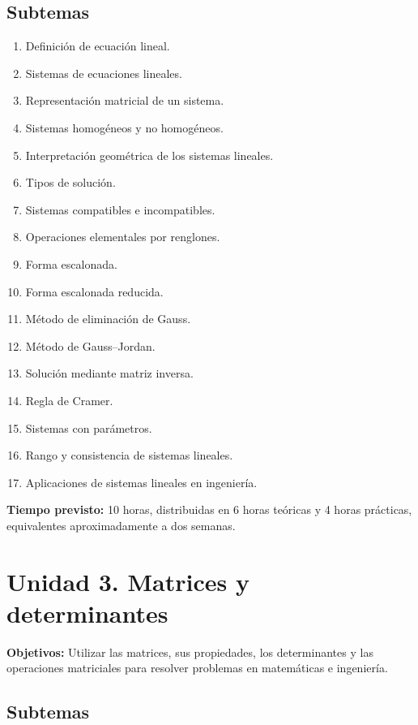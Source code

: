 \documentclass[12pt]{article}
\begin{document}
\subsection*{Subtemas}

\begin{enumerate}
    \item Definición de ecuación lineal.
    \item Sistemas de ecuaciones lineales.
    \item Representación matricial de un sistema.
    \item Sistemas homogéneos y no homogéneos.
    \item Interpretación geométrica de los sistemas lineales.
    \item Tipos de solución.
    \item Sistemas compatibles e incompatibles.
    \item Operaciones elementales por renglones.
    \item Forma escalonada.
    \item Forma escalonada reducida.
    \item Método de eliminación de Gauss.
    \item Método de Gauss--Jordan.
    \item Solución mediante matriz inversa.
    \item Regla de Cramer.
    \item Sistemas con parámetros.
    \item Rango y consistencia de sistemas lineales.
    \item Aplicaciones de sistemas lineales en ingeniería.
\end{enumerate}

\textbf{Tiempo previsto:} 10 horas, distribuidas en 6 horas teóricas
y 4 horas prácticas, equivalentes aproximadamente a dos semanas.

\section{Unidad 3. Matrices y determinantes}

\textbf{Objetivos:}  Utilizar las matrices, sus propiedades, los determinantes y las operaciones matriciales para resolver problemas en matemáticas e ingeniería.

\subsection*{Subtemas}
\end{document}
